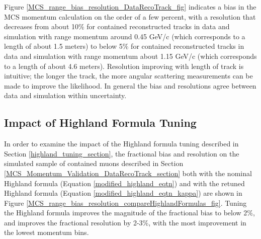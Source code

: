 \documentclass[a4paper,11pt]{article}
\begin{document}
Figure \ref{MCS_range_bias_resolution_DataRecoTrack_fig} indicates a bias in the MCS momentum calculation on the order of a few percent, with a resolution that decreases from about 10\% for contained reconstructed tracks in data and simulation with range momentum around 0.45 GeV/c (which corresponds to a length of about 1.5 meters) to below 5\% for contained reconstructed tracks in data and simulation with range momentum about 1.15 GeV/c (which corresponds to a length of about 4.6 meters). Resolution improving with length of track is intuitive; the longer the track, the more angular scattering measurements can be made to improve the likelihood. In general the bias and resolutions agree between data and simulation within uncertainty.\\

\subsection{Impact of Highland Formula Tuning}\label{highland_formula_tuning_impact_section}

In order to examine the impact of the Highland formula tuning described in Section \ref{highland_tuning_section}, the fractional bias and resolution on the simulated sample of contained muons described in Section \ref{MCS_Momentum_Validation_DataRecoTrack_section} both with the nominal Highland formula (Equation \ref{modified_highland_eqtn}) and with the retuned Highland formula (Equation \ref{modified_highland_eqtn_kappa}) are shown in Figure \ref{MCS_range_bias_resolution_compareHighlandFormulas_fig}. Tuning the Highland formula improves the magnitude of the fractional bias to below 2\%, and improves the fractional resolution by 2-3\%, with the most improvement in the lowest momentum bins.
\end{document}

